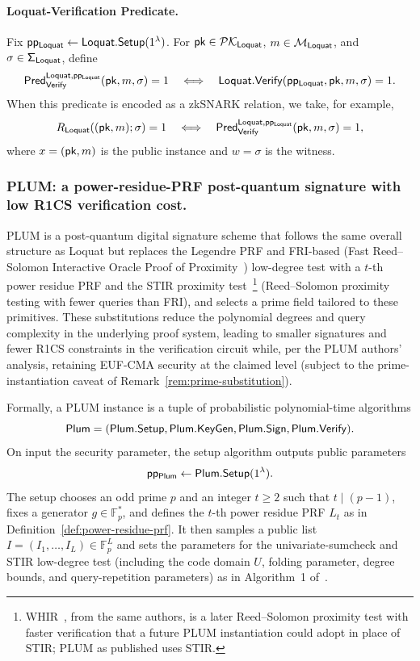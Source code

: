 \paragraph{Loquat-Verification Predicate.}
Fix \(\mathsf{pp_{Loquat}}\leftarrow\mathsf{Loquat}.\mathsf{Setup}(1^\lambda)\). For \(\mathsf{pk} \in \mathsf{\mathcal{PK}_{Loquat}}\), \(m \in \mathsf{\mathcal{M}_{Loquat}}\), and \(\sigma \in \mathsf{\Sigma_{Loquat}}\), define
\begin{equation*}
  \mathsf{Pred}_{\mathsf{Verify}}^{\mathsf{Loquat},\mathsf{pp_{Loquat}}}(\mathsf{pk},m,\sigma)=1
  \quad\Longleftrightarrow\quad
  \mathsf{Loquat}.\mathsf{Verify}(\mathsf{pp_{Loquat}},\mathsf{pk},m,\sigma)=1.
\end{equation*}
When this predicate is encoded as a zkSNARK relation, we take, for example,
\begin{equation*}
  R_{\mathsf{Loquat}}((\mathsf{pk},m);\sigma)=1
  \quad\Longleftrightarrow\quad
  \mathsf{Pred}_{\mathsf{Verify}}^{\mathsf{Loquat},\mathsf{pp_{Loquat}}}(\mathsf{pk},m,\sigma)=1,
\end{equation*}
where \(x=(\mathsf{pk},m)\) is the public instance and \(w=\sigma\) is the witness.

\subsubsection{PLUM: a power-residue-PRF post-quantum signature with low R1CS verification cost.}
PLUM is a post-quantum digital signature scheme that follows the same overall structure as Loquat but replaces the Legendre PRF and FRI-based (Fast Reed--Solomon Interactive Oracle Proof of Proximity~\cite{bensasson2018fri}) low-degree test with a \(t\)-th power residue PRF and the STIR proximity test~\cite{cryptoeprint:2024/390}\footnote{WHIR~\cite{whir2024}, from the same authors, is a later Reed--Solomon proximity test with faster verification that a future PLUM instantiation could adopt in place of STIR; PLUM as published uses STIR.} (Reed--Solomon proximity testing with fewer queries than FRI), and selects a prime field tailored to these primitives. These substitutions reduce the polynomial degrees and query complexity in the underlying proof system, leading to smaller signatures and fewer R1CS constraints in the verification circuit while, per the PLUM authors' analysis, retaining EUF-CMA security at the claimed level (subject to the prime-instantiation caveat of Remark~\ref{rem:prime-substitution}).

Formally, a PLUM instance is a tuple of probabilistic polynomial-time algorithms
\begin{equation*}
  \mathsf{Plum} = (\mathsf{Plum}.\mathsf{Setup},\mathsf{Plum}.\mathsf{KeyGen},\mathsf{Plum}.\mathsf{Sign},\mathsf{Plum}.\mathsf{Verify}).
\end{equation*}
On input the security parameter, the setup algorithm outputs public parameters
\begin{equation*}
  \mathsf{pp_{Plum}} \leftarrow \mathsf{Plum}.\mathsf{Setup}(1^\lambda).
\end{equation*}
The setup chooses an odd prime \(p\) and an integer \(t \ge 2\) such that \(t \mid (p-1)\), fixes a generator \(g \in \mathbb{F}_p^\ast\), and defines the \(t\)-th power residue PRF \(L_t\) as in Definition~\ref{def:power-residue-prf}. 
It then samples a public list \(I = (I_1,\ldots,I_L) \in \mathbb{F}_p^L\) and sets the parameters for the univariate-sumcheck and STIR low-degree test (including the code domain \(U\), folding parameter, degree bounds, and query-repetition parameters) as in Algorithm~1 of~\cite{10.1007/978-981-95-2961-2_6}.

